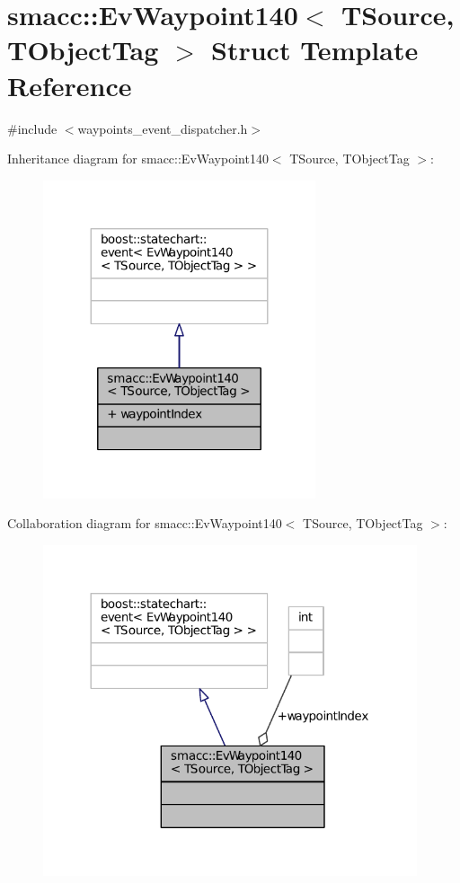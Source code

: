 \hypertarget{structsmacc_1_1EvWaypoint140}{}\section{smacc\+:\+:Ev\+Waypoint140$<$ T\+Source, T\+Object\+Tag $>$ Struct Template Reference}
\label{structsmacc_1_1EvWaypoint140}


{\ttfamily \#include $<$waypoints\+\_\+event\+\_\+dispatcher.\+h$>$}



Inheritance diagram for smacc\+:\+:Ev\+Waypoint140$<$ T\+Source, T\+Object\+Tag $>$\+:
\nopagebreak
\begin{figure}[H]
\begin{center}
\leavevmode
\includegraphics[width=227pt]{structsmacc_1_1EvWaypoint140__inherit__graph}
\end{center}
\end{figure}


Collaboration diagram for smacc\+:\+:Ev\+Waypoint140$<$ T\+Source, T\+Object\+Tag $>$\+:
\nopagebreak
\begin{figure}[H]
\begin{center}
\leavevmode
\includegraphics[width=312pt]{structsmacc_1_1EvWaypoint140__coll__graph}
\end{center}
\end{figure}
